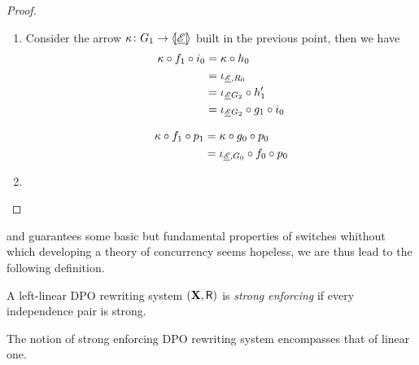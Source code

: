 \begin{proof}
	\begin{enumerate}
		\item   Consider the arrow $\kappa\colon G_1\to \langle \hspace{-1.85pt}[ \underline{\mathscr{E}}]\hspace{-1.85pt}\rangle$ built in the previous point, then we have
		\begin{align*}
			\kappa \circ f_1\circ i_0&=\kappa\circ h_0\\&=\iota_{\underline{\mathscr{E}},R_0}\\&=\iota_{\underline{\mathscr{E}}{G_2}}\circ h'_1\\&=\iota_{\underline{\mathscr{E}}{G_2}}\circ g_1\circ i_0
		\end{align*}
		
		\begin{align*}
			\kappa\circ f_1\circ p_1&=\kappa \circ g_0\circ p_0\\&=\iota_{\underline{\mathscr{E}},G_0}\circ f_0\circ p_0
		\end{align*}
		\item 
		\qedhere 
	\end{enumerate}
\end{proof}

 and  guarantees some basic but fundamental properties of switches whithout which developing a theory of concurrency seems hopeless, we are thus lead to the following definition.

\begin{definition}
A left-linear DPO rewriting system $(\textbf {\textup{X}}, \mathsf{R})$ is \emph{strong enforcing} if every independence pair is strong.
\end{definition}

The notion of strong enforcing DPO rewriting system encompasses that of linear one.


